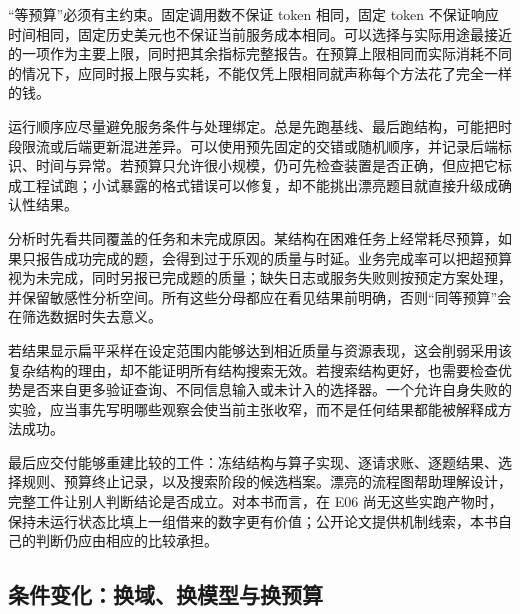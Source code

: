 “等预算”必须有主约束。固定调用数不保证 token 相同，固定 token 不保证响应时间相同，固定历史美元也不保证当前服务成本相同。可以选择与实际用途最接近的一项作为主要上限，同时把其余指标完整报告。在预算上限相同而实际消耗不同的情况下，应同时报上限与实耗，不能仅凭上限相同就声称每个方法花了完全一样的钱。

运行顺序应尽量避免服务条件与处理绑定。总是先跑基线、最后跑结构，可能把时段限流或后端更新混进差异。可以使用预先固定的交错或随机顺序，并记录后端标识、时间与异常。若预算只允许很小规模，仍可先检查装置是否正确，但应把它标成工程试跑；小试暴露的格式错误可以修复，却不能挑出漂亮题目就直接升级成确认性结果。

分析时先看共同覆盖的任务和未完成原因。某结构在困难任务上经常耗尽预算，如果只报告成功完成的题，会得到过于乐观的质量与时延。业务完成率可以把超预算视为未完成，同时另报已完成题的质量；缺失日志或服务失败则按预定方案处理，并保留敏感性分析空间。所有这些分母都应在看见结果前明确，否则“同等预算”会在筛选数据时失去意义。

若结果显示扁平采样在设定范围内能够达到相近质量与资源表现，这会削弱采用该复杂结构的理由，却不能证明所有结构搜索无效。若搜索结构更好，也需要检查优势是否来自更多验证查询、不同信息输入或未计入的选择器。一个允许自身失败的实验，应当事先写明哪些观察会使当前主张收窄，而不是任何结果都能被解释成方法成功。

最后应交付能够重建比较的工件：冻结结构与算子实现、逐请求账、逐题结果、选择规则、预算终止记录，以及搜索阶段的候选档案。漂亮的流程图帮助理解设计，完整工件让别人判断结论是否成立。对本书而言，在 E06 尚无这些实跑产物时，保持未运行状态比填上一组借来的数字更有价值；公开论文提供机制线索，本书自己的判断仍应由相应的比较承担。


\subsection{条件变化：换域、换模型与换预算}
\label{sec:ch09-conditions}

